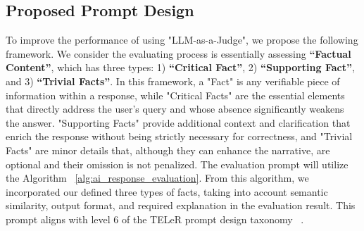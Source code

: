 \subsection{Proposed Prompt Design}\label{sec:promptDesign}
To improve the performance of using "LLM-as-a-Judge", we propose the following framework. We consider the evaluating process is essentially assessing \textbf{``Factual Content''}, which has three types: 1) \textbf{``Critical Fact''}, 2) \textbf{``Supporting Fact''}, and 3) \textbf{``Trivial Facts''}. In this framework, a "Fact" is any verifiable piece of information within a response, while "Critical Facts" are the essential elements that directly address the user's query and whose absence significantly weakens the answer. "Supporting Facts" provide additional context and clarification that enrich the response without being strictly necessary for correctness, and "Trivial Facts" are minor details that, although they can enhance the narrative, are optional and their omission is not penalized. The evaluation prompt will utilize the Algorithm ~\ref{alg:ai_response_evaluation}. From this algorithm, we incorporated our defined three types of facts, taking into account semantic similarity, output format, and required explanation in the evaluation result. This prompt aligns with level 6 of the TELeR prompt design taxonomy ~\cite{santu2023teler}. 



